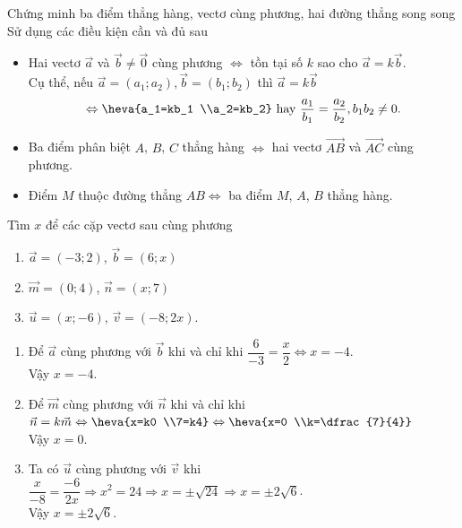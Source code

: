\begin{dang}{Chứng minh ba điểm thẳng hàng, vectơ cùng phương, hai đường thẳng song song}
    Sử dụng các điều kiện cần và đủ sau
    \begin{itemize}
        \item Hai vectơ $\vec{a}$ và $\vec{b} \neq \vec{0}$ cùng phương $\Leftrightarrow$ tồn tại số $k$ sao cho $\vec{a}=k\vec{b}$.\\
        Cụ thể, nếu $\vec{a}=(a_1;a_2), \vec{b}=(b_1;b_2)$ thì $\vec{a}=k\vec{b}$ 
        $$\Leftrightarrow \heva{a_1=kb_1 \\a_2=kb_2} \text{ hay } \dfrac{a_1}{b_1}=\dfrac{a_2}{b_2}, b_1b_2 \ne 0.$$
    \item Ba điểm phân biệt $A$, $B$, $C$ thẳng hàng $\Leftrightarrow$ hai vectơ $\vec{AB}$ và $\vec{AC}$ cùng phương.
    \item Điểm $M$ thuộc đường thẳng $AB \Leftrightarrow$ ba điểm $M$, $A$, $B$ thẳng hàng.
    \end{itemize}
\end{dang}
\begin{vd}%
Tìm $x$ để các cặp vectơ sau cùng phương
\begin{enumerate}
\item $\vec{a}=(-3;2)$, $\vec{b}=(6;x)$
\item $\vec{m}=(0;4)$, $\vec{n}=(x;7)$
\item $\vec{u}=(x;-6)$, $\vec{v}=(-8;2x)$.
\end{enumerate}
\loigiai
{\begin{enumerate}
\item Để $\vec{a}$ cùng phương với $\vec{b}$ khi và chỉ khi $\dfrac{6}{-3}=\dfrac{x}{2} \Leftrightarrow x=-4$.\\
Vậy $x=-4$.
\item Để $\vec{m}$ cùng phương với $\vec{n}$ khi và chỉ khi $\vec{n}=k\vec{m} \Leftrightarrow \heva{x=k0 \\7=k4} \Leftrightarrow \heva{x=0 \\k=\dfrac{7}{4}}$\\
Vậy $x=0$.
\item Ta có $\vec{u}$ cùng phương với $\vec{v}$ khi $\dfrac{x}{-8}=\dfrac{-6}{2x} \Rightarrow x^2=24 \Rightarrow x=\pm \sqrt{24} \Rightarrow x=\pm 2\sqrt{6}$.\\
Vậy $x=\pm 2\sqrt{6}$.
\end{enumerate}}
\end{vd}
